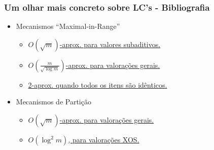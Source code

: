 \documentclass{beamer}
\begin{document}
\begin{frame}
    \frametitle{Um olhar mais concreto sobre LC's - Bibliografia}
    \begin{itemize}
        \item{Mecanismos ``Maximal-in-Range''}
        \begin{itemize}
            \item{\href{https://www.researchgate.net/publication/221591167_Approximation_algorithms_for_combinatorial_auctions_with_complement-free_bidders}{$O(\sqrt{m})$-aprox. para valores subaditivos.}}
            \item{\href{https://holzman.technion.ac.il/files/2012/09/gebrndm.pdf}{$O(\frac{m}{\sqrt{\log m}})$-aprox. para valorações gerais.}}
            \item{\href{http://www.cs.cmu.edu/~sandholm/www/cs15-892F13/multi-unit\%20auctions\%20-\%20beyond\%20Roberts.ec11.pdf}{2-aprox. quando todos os itens são idênticos.}}
        \end{itemize}
        \item{Mecanismos de Partição}
        \begin{itemize}
            \item{\href{https://www.sciencedirect.com/science/article/pii/S0022000011000390}{$O(\sqrt{m})$-aprox. para valorações gerais.}}
            \item{\href{https://www.sciencedirect.com/science/article/pii/S0022000011000390}{$O(\log^2{m})$, para valorações XOS.}}
            \
        \end{itemize}
        
    \end{itemize}
\end{frame}
\end{document}
